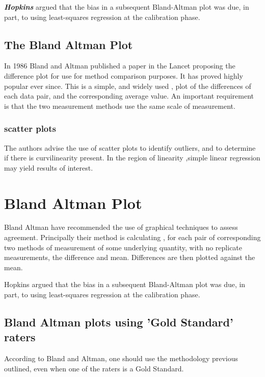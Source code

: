 \documentclass[Main.tex]{subfiles}
\begin{document}
	\textbf{\textit{Hopkins}} argued that the bias in a subsequent Bland-Altman plot was
	due, in part, to using least-squares regression at the calibration
	phase.
	
	
	\subsection{The Bland Altman Plot}
	In 1986 Bland and Altman published a paper in the Lancet proposing
	the difference plot for use for method comparison purposes. It has
	proved highly popular ever since. This is a simple, and widely
	used , plot of the differences of each data pair, and the
	corresponding average value. An important requirement is that the
	two measurement methods use the same scale of measurement.
	
	\subsubsection{scatter plots} The authors advise the
	use of scatter plots to identify outliers, and to determine if
	there is curvilinearity present. In the region of linearity
	,simple linear regression may yield results of interest.
	

\section{Bland Altman Plot} Bland Altman have
	recommended the use of graphical techniques to assess agreement.
	Principally their method is calculating , for each pair of
	corresponding two methods of measurement of some underlying
	quantity, with no replicate measurements, the difference and mean.
	Differences are then plotted against the mean.
	
	
	Hopkins argued that the bias in a subsequent Bland-Altman plot was
	due, in part, to using least-squares regression at the calibration
	phase.
	
	\subsection{Bland Altman plots using 'Gold Standard' raters}
	According to Bland and Altman, one should use the methodology
	previous outlined, even when one of the raters is a Gold Standard.
	
\end{document}
